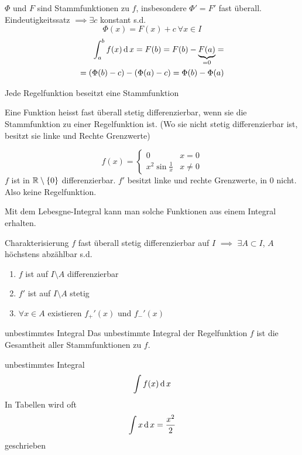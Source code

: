 \begin{Bew}
  $\Phi$ und $F$ sind Stammfunktionen zu $f$, insbesondere $\Phi'=F'$ fast überall. Eindeutigkeitssatz $\implies \exists c$ konstant s.d.
  \[\Phi(x)=F(x)+c\ \forall x\in I\]
  \begin{align*}
    \int^b_af(x)\operatorname{d} x=F(b)=F(b)-\underbrace{F(a)}_{=0}=\\
    =\left( \Phi(b)-c \right) - \left( \Phi(a)-c \right) = \Phi(b)-\Phi(a)
  \end{align*}
\end{Bew}
\begin{Kor}
  Jede Regelfunktion beseitzt eine Stammfunktion  
\end{Kor}
\begin{Def}
  Eine Funktion heisst fast überall stetig differenzierbar, wenn sie die Stammfunktion zu einer Regelfunktion ist. (Wo sie nicht stetig differenzierbar ist, besitzt sie linke und Rechte Grenzwerte)
\end{Def}
\begin{Bsp}
  \[f(x)=\begin{cases}
    0& x=0\\
    x^2\sin\frac{1}{x}&x\neq 0
  \end{cases}\]
  $f$ ist in $\mathbb{R}\setminus\{0\}$ differenzierbar. $f'$ besitzt linke und rechte Grenzwerte, in 0 nicht. Also keine Regelfunktion.
\end{Bsp}
\begin{Bem}
  Mit dem Lebesgne-Integral kann man solche Funktionen aus einem Integral erhalten.
\end{Bem}
\begin{Eig}{Charakterisierung}
  $f$ fast überall stetig differenzierbar auf $I$ $\implies$ $\exists A\subset I$, $A$ höchstens abzählbar s.d.
  \begin{enumerate}
    \item $f$ ist auf $I\setminus A$ differenzierbar
    \item $f'$ ist auf $I\setminus A$ stetig
    \item $\forall x\in A$ existieren $f_+'(x)$ und $f_-'(x)$
  \end{enumerate}
\end{Eig}
\begin{Def}{unbestimmtes Integral}
  Das unbestimmte Integral der Regelfunktion $f$ ist die Gesamtheit aller Stammfunktionen zu $f$.
\end{Def}
\begin{Not}{unbestimmtes Integral}
  \[\int f(x)\operatorname{d} x\]
  In Tabellen wird oft
  \[\int x\operatorname{d} x = \frac{x^2}{2}\]
  geschrieben
\end{Not}
